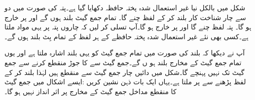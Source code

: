 شکل    میں بالکل نیا غیر استعمال شدہ پختہ حافظہ دکھایا گیا ہے۔پتہ  کی صورت میں دو سے چار شناخت کار  بلند کر کے لفظ  چنے گا۔ تمام جمع گیٹ بلند ہوں گے اور  پر  خارج ہو گا۔ پتہ  لفظ  چنے گا اور  پر  خارج ہو گا۔آپ تسلی کر لیں کہ چاروں پتہ پر یہی مواد ملتا ہے۔کسی بھی نئے غیر استعمال شدہ پختہ حافظے کے ہر لفظ کے تمام بِٹ بلند  ہوں گے۔


آپ نے دیکھا کہ بلند  کی صورت میں تمام جمع گیٹ کو یہی بلند اشارہ ملتا ہے اور یوں تمام جمع گیٹ کے مخارج بلند ہو ں گے۔جمع گیٹ سے  کا جوڑ منقطع کرنے سے  جمع گیٹ تک نہیں پہنچے گا۔شکل    میں دائیں چار جمع  گیٹ  سے منقطع ہیں لہٰذا  بلند کر کے لفظ  پڑھنے سے  پر  ملتا ہے۔یہاں ایک بات ذہن نشین کریں :ایسے اشکال میں جمع گیٹ کا منقطع مداخل جمع گیٹ کے مخارج پر اثر انداز نہیں ہو گا۔
